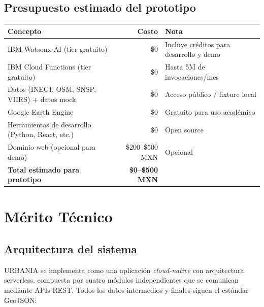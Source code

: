 \documentclass[12pt,a4paper]{article}
\begin{document}
\subsection{Presupuesto estimado del prototipo}

\begin{table}[H]
\centering
\small
\renewcommand{\arraystretch}{1.3}
\begin{tabularx}{\textwidth}{X r l}
\toprule
\rowcolor{grisoscuro}
\color{white}\textbf{Concepto} & \color{white}\textbf{Costo} & \color{white}\textbf{Nota} \\
\midrule
IBM Watsonx AI (tier gratuito) & \$0 & Incluye créditos para desarrollo y demo \\
\rowcolor{fondofila}
IBM Cloud Functions (tier gratuito) & \$0 & Hasta 5M de invocaciones/mes \\
Datos (INEGI, OSM, SNSP, VIIRS) + datos mock & \$0 & Acceso público / fixture local \\
\rowcolor{fondofila}
Google Earth Engine & \$0 & Gratuito para uso académico \\
Herramientas de desarrollo (Python, React, etc.) & \$0 & Open source \\
\rowcolor{fondofila}
Dominio web (opcional para demo) & \$200–\$500 MXN & Opcional \\
\midrule
\rowcolor{fondofila}
\textbf{Total estimado para prototipo} & \textbf{\$0–\$500 MXN} & \\
\bottomrule
\end{tabularx}
\end{table}


\newpage
\section{Mérito Técnico}

\subsection{Arquitectura del sistema}

URBANIA se implementa como una aplicación \textit{cloud-native} con arquitectura serverless, compuesta por cuatro módulos independientes que se comunican mediante APIs REST. Todos los datos intermedios y finales siguen el estándar GeoJSON:
\end{document}
